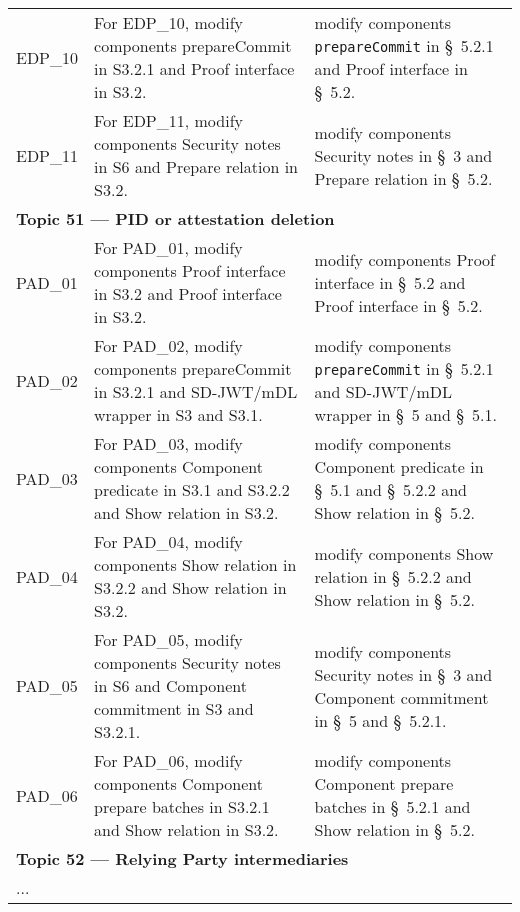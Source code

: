 \begin{landscape}
\begin{longtable}{p{3cm} p{10cm} p{7cm}}
EDP\_10 &
For EDP\_10, modify components prepareCommit in S3.2.1 and Proof interface in S3.2. &
modify components \texttt{prepareCommit} in \S~5.2.1 and Proof interface in \S~5.2. \\

EDP\_11 &
For EDP\_11, modify components Security notes in S6 and Prepare relation in S3.2. &
modify components Security notes in \S~3 and Prepare relation in \S~5.2. \\[1em]


\multicolumn{3}{l}{\textbf{Topic 51 — PID or attestation deletion}}\\

PAD\_01 &
For PAD\_01, modify components Proof interface in S3.2 and Proof interface in S3.2. &
modify components Proof interface in \S~5.2 and Proof interface in \S~5.2. \\

PAD\_02 &
For PAD\_02, modify components prepareCommit in S3.2.1 and SD-JWT/mDL wrapper in S3 and S3.1. &
modify components \texttt{prepareCommit} in \S~5.2.1 and SD-JWT/mDL wrapper in \S~5 and \S~5.1. \\

PAD\_03 &
For PAD\_03, modify components Component predicate in S3.1 and S3.2.2 and Show relation in S3.2. &
modify components Component predicate in \S~5.1 and \S~5.2.2 and Show relation in \S~5.2. \\

PAD\_04 &
For PAD\_04, modify components Show relation in S3.2.2 and Show relation in S3.2. &
modify components Show relation in \S~5.2.2 and Show relation in \S~5.2. \\

PAD\_05 &
For PAD\_05, modify components Security notes in S6 and Component commitment in S3 and S3.2.1. &
modify components Security notes in \S~3 and Component commitment in \S~5 and \S~5.2.1. \\

PAD\_06 &
For PAD\_06, modify components Component prepare batches in S3.2.1 and Show relation in S3.2. &
modify components Component prepare batches in \S~5.2.1 and Show relation in \S~5.2. \\[1em]


\multicolumn{3}{l}{\textbf{Topic 52 — Relying Party intermediaries}}\\

\multicolumn{3}{l}{...} \\

\end{longtable}
\end{landscape}



